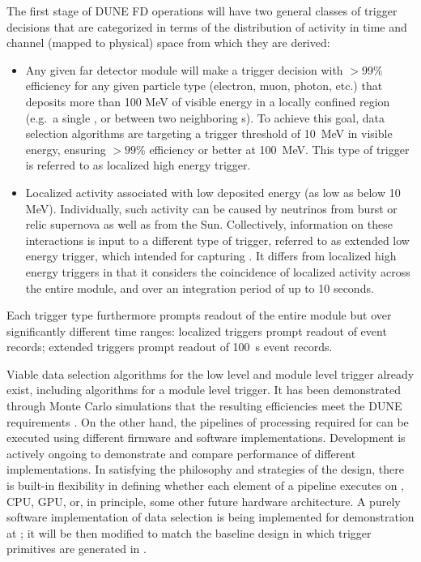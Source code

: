 The first stage of DUNE FD operations will have two general classes of trigger
decisions that are categorized in terms of the distribution of activity
in time and channel (mapped to physical) space from which they are derived: 
\begin{itemize}
\item Any given far detector module will make a 
  trigger decision with $>$99\% efficiency for any given particle
  type (electron, muon, photon, etc.) 
  that deposits more than 100 MeV of visible energy in a locally
  confined region (e.g.~a single , or between two neighboring s). To achieve this
  goal, data selection algorithms are targeting a trigger threshold of
  \SI{10}{\MeV} in visible energy, ensuring $>99$\% efficiency or better
  at \SI{100}{\MeV}. 
  This type of trigger is referred to as localized high
  energy trigger.
\item Localized activity associated with low deposited energy (as low as below 10 MeV). 
  Individually, such activity can be caused by neutrinos from burst or relic supernova as well as from the Sun.
  Collectively, information on these interactions is input to a different type of trigger,
  referred to as extended low energy trigger, which intended for
  capturing .
  It differs from localized high
  energy triggers in that it considers the coincidence of localized
  activity across the entire module, and over an integration period of up to 10
  seconds.
\end{itemize}
Each trigger type furthermore prompts readout
    of the entire module but over significantly different time
    ranges: localized triggers prompt readout of \spreadout event records; extended
    triggers prompt readout of \SI{100}{\second} event records. 

Viable data selection algorithms for the low level and module level trigger already exist, including
algorithms for a module level  trigger.  It has
been demonstrated through Monte Carlo simulations that the resulting efficiencies meet the DUNE
requirements \cite{bib:docdb11215}. On the other hand, the pipelines of processing required
for  can be executed using different firmware and software
implementations. Development is actively ongoing to demonstrate
and compare performance of different implementations. In satisfying
the philosophy and strategies of the  design, there is built-in
flexibility in defining whether each element of a pipeline executes on
, CPU, GPU, or, in principle, some other future hardware
architecture. A purely software implementation of data selection is being
implemented for demonstration at ; it will be then modified to match the baseline design in which trigger primitives are generated in .

